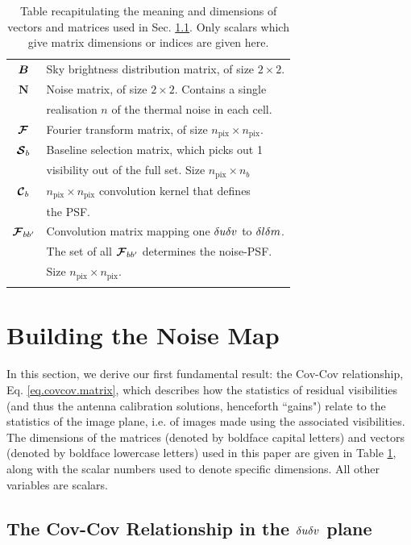\begin{table}[t!]
\begin{tabular}{c l}
$\bm{{B}}_{}$        & Sky brightness distribution matrix, of size $2 \times 2$.\\
$\bm{N}$       & Noise matrix, of size $2\times 2$. Contains a single \\
& realisation $n$ of the thermal noise in each cell.\\
$\bm{\mathcal{F}}$       & Fourier transform matrix, of size $n_{\mathrm{pix}}\times n_{\mathrm{pix}}$.\\
$\bm{\mathcal{S}}_b$     & Baseline selection matrix, which picks out 1\\
&  visibility out of the full set. Size $n_{\mathrm{pix}} \times n_b$\\
$\bm{\mathcal{C}}_b$     & $n_{\mathrm{pix}} \times n_{\mathrm{pix}}$ convolution kernel that defines\\
               &  the PSF.\\
$\bm{\mathcal{F}}_{bb'}$ & Convolution matrix mapping one $\delta u\delta v$ to $\delta l\delta m$.\\
& The set of all $\bm{\mathcal{F}}_{bb'}$ determines the noise-PSF.\\
               & Size $n_{\mathrm{pix}} \times n_{\mathrm{pix}}$.\\
&\\
\hline
\end{tabular}
\caption{Table recapitulating the meaning and dimensions of vectors and matrices used {in Sec. \ref{sec.dudv}}. Only scalars which give matrix dimensions or indices are given here.}
\label{tab.variables}
\end{table}

\section{Building the Noise Map}\label{sec.formalism}

\pg
In this section, we derive our first fundamental result: the Cov-Cov relationship, Eq. \ref{eq.covcov.matrix}, which describes how the statistics of residual visibilities (and thus the antenna calibration solutions, henceforth ``gains") relate to the statistics of the image plane, i.e. of images made using the associated visibilities. The dimensions of the matrices (denoted by boldface capital letters) and vectors (denoted by boldface lowercase letters) used in this paper are given in Table \ref{tab.variables}, along with the scalar numbers used to denote specific dimensions. All other variables are scalars.


\subsection{The Cov-Cov Relationship in the $\delta u\delta v$ plane}\label{sec.dudv}

